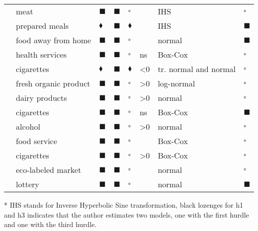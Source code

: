 \begin{table}
\begin{threeparttable}
\begin{center}
\begin{footnotesize}
\begin{tabular}{llllllll}
  \cite{NEWM:HENC:MATT:01} & meat & $\blacksquare$ & $\blacksquare$ & $\square$ &  & IHS & $\square$ \\ 
  \cite{NEWM:HENC:MATT:03} & prepared meals & $\blacklozenge$ & $\blacksquare$ & $\blacklozenge$ &  & IHS & $\blacksquare$ \\ 
  \cite{MUTL:GRAC:04} & food away from home & $\blacksquare$ & $\blacksquare$ & $\square$ &  & normal & $\blacksquare$ \\ 
  \cite{CHAZ:05} & health services & $\blacksquare$ & $\blacksquare$ & $\square$ & ns & Box-Cox & $\square$ \\ 
  \cite{YEN:05} & cigarettes & $\blacklozenge$ & $\blacksquare$ & $\blacklozenge$ & <0 & tr. normal and normal & $\square$ \\ 
  \cite{ZHAN:HUAN:LIN:06} & fresh organic product & $\blacksquare$ & $\blacksquare$ & $\square$ & >0 & log-normal & $\square$ \\ 
  \cite{FULL:BEGH:ROZE:07} & dairy products & $\blacksquare$ & $\blacksquare$ & $\square$ & >0 & normal & $\square$ \\ 
  \cite{ARIS:PIER:08} & cigarettes & $\blacksquare$ & $\blacksquare$ & $\square$ & ns & Box-Cox & $\blacksquare$ \\ 
  \cite{ARIS:PERA:PIER:08} & alcohol & $\blacksquare$ & $\blacksquare$ & $\square$ & >0 & normal & $\square$ \\ 
  \cite{KEEL:HENCH:NEWM:09} & food service & $\blacksquare$ & $\blacksquare$ & $\square$ &  & Box-Cox & $\square$ \\ 
  \cite{ARIS:PIER:09} & cigarettes & $\blacksquare$ & $\blacksquare$ & $\square$ & >0 & Box-Cox & $\square$ \\ 
  \cite{BROU:KHAN:12} & eco-labeled market & $\blacksquare$ & $\blacksquare$ & $\square$ &  & normal & $\square$ \\ 
  \cite{CROW:EAKI:JORD:12} & lottery & $\blacksquare$ & $\blacksquare$ & $\square$ &  & normal & $\blacksquare$ \\ 
   \hline
\end{tabular}\begin{tablenotes}
  \item[*] IHS stands for Inverse Hyperbolic Sine transformation, black lozenges for h1 and h3 indicates that the
  author estimates two models, one with the first hurdle and one with
  the third hurdle.
\end{tablenotes}
\end{footnotesize}
\end{center}
\end{threeparttable}
\end{table}
